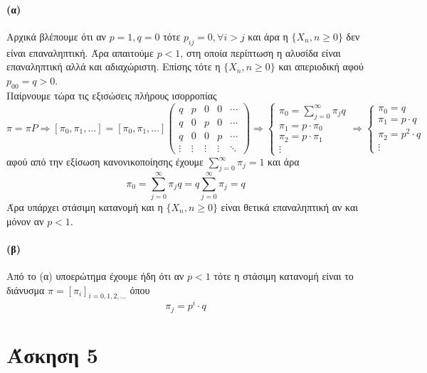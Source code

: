 \documentclass[a4paper,11pt]{article}
\begin{document}
\paragraph{(α)}
Αρχικά βλέπουμε ότι αν $p=1, q=0$ τότε $p_{ij} = 0, \forall i > j$ και άρα η $\{X_n,n\geq 0\}$ δεν είναι επαναληπτική.
Άρα απαιτούμε $p<1$, στη οποία περίπτωση η αλυσίδα είναι επαναληπτική αλλά και αδιαχώριστη.
Επίσης τότε η $\{X_n,n\geq 0\}$ και απεριοδική αφού $p_{00} = q > 0$.
\\[8pt]
Παίρνουμε τώρα τις εξισώσεις πλήρους ισορροπίας
\[
	\pi = \pi P \Rightarrow [\pi_0,\pi_1,\dots] = [\pi_0,\pi_1,\dots]
		\begin{pmatrix}
			q & p & 0 & 0 & \cdots\\
			q & 0 & p & 0 & \cdots\\
			q & 0 & 0 & p & \cdots\\
			\vdots & \vdots & \vdots & \vdots & \ddots
		\end{pmatrix}
		\Rightarrow
			\begin{cases}
				\pi_0 = \sum_{j=0}^\infty \pi_j q\\
				\pi_1 = p \cdot \pi_0\\
				\pi_2 = p \cdot \pi_1 \\
				\vdots
			\end{cases}
		\Rightarrow
			\begin{cases}
				\pi_0 = q\\
				\pi_1 = p \cdot q\\
				\pi_2 = p^2 \cdot q \\
				\vdots
			\end{cases}
\]
αφού από την εξίσωση κανονικοποίησης έχουμε $\sum_{j=0}^\infty \pi_j = 1$ και άρα
\[\pi_0 = \sum_{j=0}^\infty \pi_j q = q \sum_{j=0}^\infty \pi_j = q\]
Άρα υπάρχει στάσιμη κατανομή και η $\{X_n,n\geq 0\}$ είναι θετικά επαναληπτική αν και μόνον αν $p<1$.

\paragraph{(β)}
Από το (α) υποερώτημα έχουμε ήδη ότι αν $p<1$ τότε η στάσιμη κατανομή είναι το διάνυσμα $\pi = [\pi_i]_{i=0,1,2,\dots}$ όπου
\[\pi_j = p^i \cdot q\]


\section*{Άσκηση 5}
\end{document}
